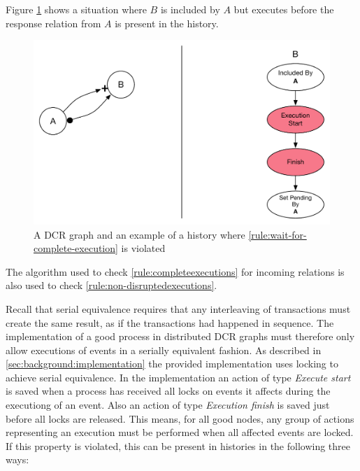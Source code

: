 	\noindent Figure \ref{fig:validation:wait-for-complete-execution} shows a situation where $B$ is included by $A$ but executes before the response relation from $A$ is present in the history.
	
	\begin{figure}[H]
		\centering
		\includegraphics[width=.7\textwidth]{5validation/images/wait-for-complete-execution.pdf}
		\caption{A DCR graph and an example of a history where \autoref{rule:wait-for-complete-execution} is violated}
		\label{fig:validation:wait-for-complete-execution}
	\end{figure}
	
	\noindent The algorithm used to check \autoref{rule:completeexecutions} for incoming relations is also used to check \autoref{rule:non-disruptedexecutions}.
	
	\newpar Recall that serial equivalence requires that any interleaving of transactions must create the same result, as if the transactions had happened in sequence. The implementation of a good process in distributed DCR graphs must therefore only allow executions of events in a serially equivalent fashion. As described in \autoref{sec:background:implementation} the provided implementation uses locking to achieve serial equivalence. In the implementation an action of type \textit{Execute start} is saved when a process has received all locks on events it affects during the executiong of an event. Also an action of type \textit{Execution finish} is saved just before all locks are released. This means, for all good nodes, any group of actions representing an execution must be performed when all affected events are locked. If this property is violated, this can be present in histories in the following three ways:
	
